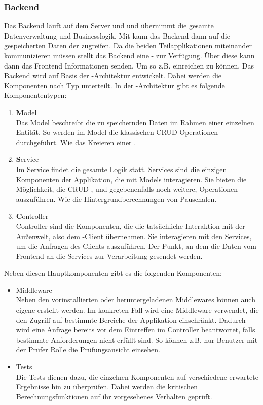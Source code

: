 \subsubsection{Backend}
\label{sec:Planungsphase:Backend}

Das Backend läuft auf dem Server und und übernimmt die gesamte Datenverwaltung und Businesslogik. Mit  kann das Backend dann auf die gespeicherten Daten der  zugreifen.
Da die beiden Teilapplikationen miteinander kommunizieren müssen stellt das Backend eine - zur Verfügung. Über diese kann dann das Frontend Informationen senden. Um so z.B.  einreichen zu können.
Das Backend wird auf Basis der -Architektur entwickelt. Dabei werden die Komponenten nach Typ unterteilt. In der -Architektur gibt es folgende Komponententypen:

\begin{enumerate}
  \item \textbf{M}odel\\
  Das Model beschreibt die zu speichernden Daten im Rahmen einer einzelnen Entität. So werden im Model die klassischen CRUD-Operationen durchgeführt. Wie das Kreieren einer .
  \item \textbf{S}ervice\\
  Im Service findet die gesamte Logik statt. Services sind die einzigen Komponenten der Applikation, die mit Models interagieren. Sie bieten die Möglichkeit, die CRUD-, und gegebenenfalls noch weitere, Operationen auszuführen. Wie die Hintergrundberechnungen von Pauschalen.
  \item \textbf{C}ontroller\\
  Controller sind die Komponenten, die die tatsächliche Interaktion mit der Außenwelt, also dem -Client übernehmen. Sie interagieren mit den Services, um die Anfragen des Clients auszuführen. Der Punkt, an dem die Daten vom Frontend an die Services zur Verarbeitung gesendet werden.
\end{enumerate}

Neben diesen Hauptkomponenten gibt es die folgenden Komponenten:

\begin{itemize}
  \item Middleware\\
Neben den vorinstallierten oder heruntergeladenen Middlewares können auch eigene erstellt werden. Im konkreten Fall wird eine Middleware verwendet, die den Zugriff auf bestimmte Bereiche der Applikation einschränkt. Dadurch wird eine Anfrage bereits vor dem Eintreffen im Controller beantwortet, falls bestimmte Anforderungen nicht erfüllt sind. So können z.B. nur Benutzer mit der Prüfer Rolle die Prüfungsansicht einsehen.
  \item Tests\\
  Die Tests dienen dazu, die einzelnen Komponenten auf verschiedene erwartete Ergebnisse hin zu überprüfen. Dabei werden die kritischen Berechnungsfunktionen auf ihr vorgesehenes Verhalten geprüft.
\end{itemize}

